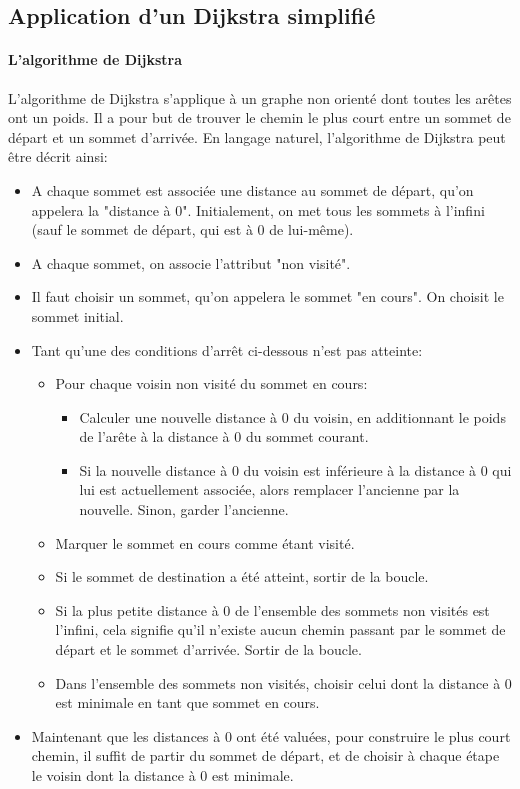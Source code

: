 \subsection{Application d'un Dijkstra simplifié}
\paragraph{L'algorithme de Dijkstra}
L'algorithme de Dijkstra s'applique à un graphe non orienté dont toutes les arêtes ont un poids. Il a pour but de trouver le chemin le plus court entre un sommet de départ et un sommet d'arrivée. En langage naturel, l'algorithme de Dijkstra peut être décrit ainsi:
\begin{itemize}
	\item A chaque sommet est associée une distance au sommet de départ, qu'on appelera la "distance à 0". Initialement, on met tous les sommets à l'infini (sauf le sommet de départ, qui est à 0 de lui-même).
	\item A chaque sommet, on associe l'attribut "non visité".
	\item Il faut choisir un sommet, qu'on appelera le sommet "en cours". On choisit le sommet initial.
	\item Tant qu'une des conditions d'arrêt ci-dessous n'est pas atteinte:
	\begin{itemize}
		\item Pour chaque voisin non visité du sommet en cours:
			\begin{itemize}
				\item Calculer une nouvelle distance à 0 du voisin, en additionnant le poids de l'arête à la distance à 0 du sommet courant.
				\item Si la nouvelle distance à 0 du voisin est inférieure à la distance à 0 qui lui est actuellement associée, alors remplacer l'ancienne par la nouvelle. Sinon, garder l'ancienne.
			\end{itemize}
		\item Marquer le sommet en cours comme étant visité.
		\item Si le sommet de destination a été atteint, sortir de la boucle.
		\item Si la plus petite distance à 0 de l'ensemble des sommets non visités est l'infini, cela signifie qu'il n'existe aucun chemin passant par le sommet de départ et le sommet d'arrivée. Sortir de la boucle.
		\item Dans l'ensemble des sommets non visités, choisir celui dont la distance à 0 est minimale en tant que sommet en cours.
	\end{itemize}
	\item Maintenant que les distances à 0 ont été valuées, pour construire le plus court chemin, il suffit de partir du sommet de départ, et de choisir à chaque étape le voisin dont la distance à 0 est minimale.
\end{itemize}
